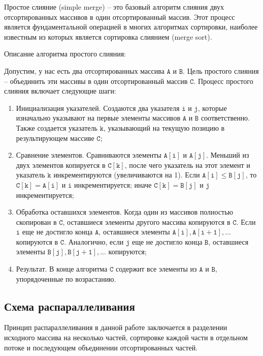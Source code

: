 \documentclass[]{article}
\theoremstyle{remark}
\theoremstyle{definition}
\newcommand{\term}[1]{$\mathtt{#1}$}
\begin{document}
\par Простое слияние (simple merge) -- это базовый алгоритм слияния двух отсортированных массивов в один отсортированный массив. Этот процесс является фундаментальной операцией в многих алгоритмах сортировки, наиболее известным из которых является сортировка слиянием (merge sort).

\par Описание алгоритма простого слияния:

\par Допустим, у нас есть два отсортированных массива \term{A} и \term{B}. Цель простого слияния -- объединить эти массивы в один отсортированный массив \term{C}. Процесс простого слияния включает следующие шаги:

\begin{enumerate}
    \item Инициализация указателей. Создаются два указателя \term{i} и \term{j}, которые изначально указывают на первые элементы массивов \term{A} и \term{B} соответственно. Также создается указатель \term{k}, указывающий на текущую позицию в результирующем массиве \term{C};
    \item Сравнение элементов. Сравниваются элементы \term{A[i]} и \term{A[j]}. Меньший из двух элементов копируется в \term{C[k]}, после чего указатель на этот элемент и указатель \term{k} инкрементируются (увеличиваются на 1). Если \term{A[i] \leq B[j]}, то \term{C[k] = A[i]} и \term{i} инкрементируется; иначе \term{C[k] = B[j]} и \term{j} инкрементируется;
    \item Обработка оставшихся элементов. Когда один из массивов полностью скопирован в \term{C}, оставшиеся элементы другого массива копируются в \term{C}. Если \term{i} еще не достигло конца \term{A}, оставшиеся элементы \term{A[i], A[i+1], \ldots} копируются в \term{C}. Аналогично, если \term{j} еще не достигло конца \term{B}, оставшиеся элементы \term{B[j], B[j+1], \ldots} копируются;
    \item Результат. В конце алгоритма \term{C} содержит все элементы из \term{A} и \term{B}, упорядоченные по возрастанию.
\end{enumerate}

\subsection{Схема распараллеливания}

\par Принцип распараллеливания в данной работе заключается в разделении исходного массива на несколько частей, сортировке каждой части в отдельном потоке и последующем объединении отсортированных частей.
\end{document}
